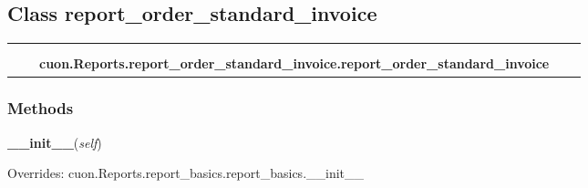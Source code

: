 \subsection{Class report\_order\_standard\_invoice}

    \label{cuon:Reports:report_order_standard_invoice:report_order_standard_invoice}
\begin{tabular}{cccccc}
\multicolumn{2}{r}{\settowidth{\BCL}{cuon.Reports.report\_basics.report\_basics}\multirow{2}{\BCL}{cuon.Reports.report\_basics.report\_basics}}
&&
  \\\cline{3-3}
  &&\multicolumn{1}{c|}{}
&&
  \\
&&\multicolumn{2}{l}{\textbf{cuon.Reports.report\_order\_standard\_invoice.report\_order\_standard\_invoice}}
\end{tabular}



  \subsubsection{Methods}

    \vspace{0.5ex}

\hspace{.8\funcindent}\begin{boxedminipage}{\funcwidth}

    \raggedright \textbf{\_\_init\_\_}(\textit{self})

\setlength{\parskip}{2ex}
\setlength{\parskip}{1ex}
      Overrides: cuon.Reports.report\_basics.report\_basics.\_\_init\_\_

    \end{boxedminipage}

    \label{cuon:Reports:report_order_standard_invoice:report_order_standard_invoice:getReportData}

    \vspace{0.5ex}

